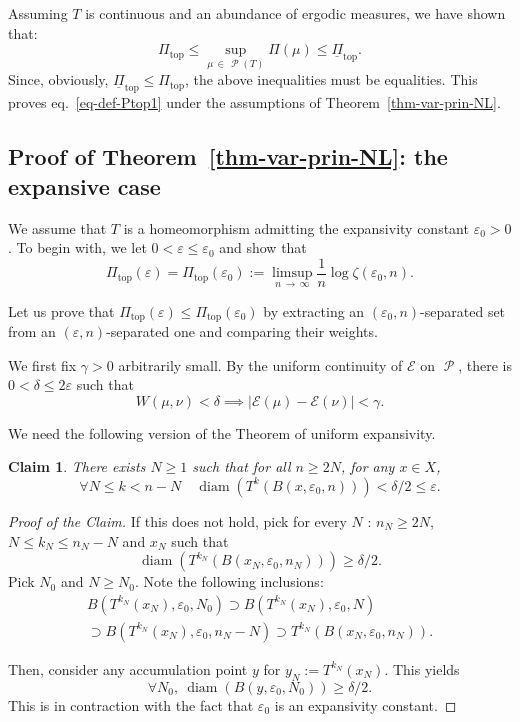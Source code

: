 \documentclass[10pt]{amsart}
\theoremstyle{definition}\newtheorem{defi}[theo]{Definition}\newtheorem{rema}[theo]{Remark}\newtheorem{exam}[theo]{Example}\newtheorem{exem}[theo]{Example}\newtheorem{nota}[theo]{Notation}
\theoremstyle{plain}
\theoremstyle{plain}
\newtheorem{claim}{Claim}
\newcommand\eps{\varepsilon}
\newcommand\NLP{\Pi}
\renewcommand\top{{\mathrm{top}}}
\newcommand{\diam}{\operatorname{diam}}
\newcommand\Prob{{\operatorname{\mathscr{P}}}}
\newcommand*\8{\infty}
\newcommand{\En}{\mathcal{E}}
\let\oldforall\forall
\renewcommand*{\forall}{\mathrel{\oldforall}}
\begin{document}
Assuming $T$ is continuous and an abundance of ergodic measures, we have shown that:
\[
\NLP_\top \le \sup_{\mu\,\in\,\Prob(T)} \NLP(\mu) \leq \underline{\NLP}_\top.
\]
Since, obviously, $\underline{\NLP}_\top \le \NLP_\top$, the above inequalities must be equalities. This proves eq.~\eqref{eq-def-Ptop1} under the assumptions of Theorem~\ref{thm-var-prin-NL}.


\subsection{Proof of Theorem~\ref{thm-var-prin-NL}: the expansive case}\label{sec-Th-A-expansive}

We assume that $T$ is a homeomorphism admitting the expansivity constant $\eps_0>0$. To begin with, we let $0<\eps\le\eps_0$ and show that
\begin{equation}\label{eq-Ptop-exp0}
\NLP_\top(\eps)=\NLP_\top(\eps_0):=\limsup_{n\,\to\,\infty} \frac1n\log\zeta(\eps_0,n).
\end{equation}

Let us prove that $\NLP_\top(\eps)\leq\NLP_\top(\eps_0)$ by extracting an $(\eps_0,n)$-separated set from an $(\eps,n)$-separated one and comparing their weights.

We first fix $\gamma>0$ arbitrarily small. By the uniform continuity of $\En$ on $\Prob$, there is $0<\delta \leq2\eps$ such that
\begin{equation}\label{eq-ECU}
W(\mu,\nu)<\delta\implies \lvert \En(\mu)-\En(\nu) \rvert<\gamma.
\end{equation}

We need the following version of the Theorem of uniform expansivity.
\begin{claim}
There exists $N\geq1$ such that for all $n\geq 2N$, for any $x\in X$,
\begin{equation}\label{eq-expansivity}
\forall N\leq k<n-N\quad \diam\left(T^k(B(x,\eps_0,n))\right)<\delta/2 \leq\eps.
\end{equation}
\end{claim}

\begin{proof}[Proof of the Claim]
If this does not hold, pick for every $N$ : $n_{N}\ge 2N$, $N\le k_{N}\le n_{N}-N$ and $x_{N}$ such that
\[
\diam\left(T^{k_{N}}(B(x_{N},\eps_{0},n_{N}))\right)\ge \delta/2.
\]
Pick $N_{0}$ and $N\ge N_{0}$. Note the following inclusions:
\begin{multline*}
B\left(T^{k_{N}}(x_{N}),\eps_{0}, N_{0}\right)\supset B\left(T^{k_{N}}(x_{N}),\eps_{0}, N\right)\\
\supset B\left(T^{k_{N}}(x_{N}),\eps_{0}, n_{N}-N\right)\supset T^{k_{N}}(B(x_{N},\eps_{0},n_{N})).
\end{multline*}


Then, consider any accumulation point $y$ for $y_{N}:=T^{k_{N}}(x_{N})$. This yields
\[
\forall N_{0},\ \diam(B(y,\eps_{0},N_{0}))\ge \delta/2.
\]
This is in contraction with the fact that $\eps_{0}$ is an expansivity constant.
\end{proof}
\end{document}

